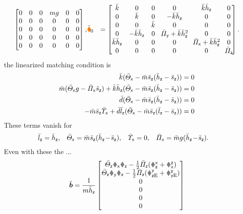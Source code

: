 \begin{align*}
\begin{bmatrix}
  0 & 0 & 0 & m\gravityAccConst & 0 & 0 \\
  0 & 0 & 0 & 0 & 0 & 0 \\
  0 & 0 & 0 & 0 & 0 & 0 \\
  0 & 0 & 0 & 0 & 0 & 0 \\
  0 & 0 & 0 & 0 & 0 & 0 \\
  \end{bmatrix},&
 \sysStiffMatCLin &=
 \begin{bmatrix}
  \kc & 0 & 0 & 0 & \kc\hcz & 0 \\
  0 & \kc & 0 & -\kc\hcz & 0 & 0 \\
  0 & 0 & \kc & 0 & 0 & 0 \\
  0 & -\kc\hcz & 0 & \!\kapcy+\kc\hcz^2\! & 0 & 0 \\
  \kc\hcz & 0 & 0 & 0 & \!\kapcx+\kc\hcz^2\! & 0 \\
  0 & 0 & 0 & 0 & 0 & \!\kapcz\! \\
 \end{bmatrix}.
\end{align*}
the linearized matching condition is
\begin{subequations}
\begin{align}
 \kc(\Jcx - \mc\scz(\hcz - \scz)) &= 0
\\
 \mc(\Jcx\gravityAccConst - \kapcx\scz) + \kc\hcz(\Jcx - \mc\scz(\hcz - \scz)) &= 0
\\
 \dc(\Jcx - \mc\scz(\hcz - \scz)) &= 0
\\
 -\mc\scz\sigcx + \dc\lcz(\Jcx - \mc\scz(\lcz - \scz)) &= 0
\end{align} 
\end{subequations}
These terms vanish for
\begin{align}
 \lcz &= \hcz,&
 \Jcx &= \mc\scz(\hcz \!-\! \scz),&
 \sigcx &= 0,&
 \kapcx &= \mc\gravityAccConst(\hcz \!-\! \scz).
\end{align}
Even with these the ...
\begin{align}
 \tilde{\sysForce} = \frac{1}{\m\hcz}\begin{bmatrix} \Jcz\wx\wz - \tfrac{1}{2}\kapcz(\Rxz+\Rzx) \\ \Jcz\wy\wz - \tfrac{1}{2}\kapcz(\REyz+\REzy) \\ 0 \\ 0 \\ 0 \\ 0 \end{bmatrix}
\end{align}

\cite{Konz:GaussTrackingControl}

